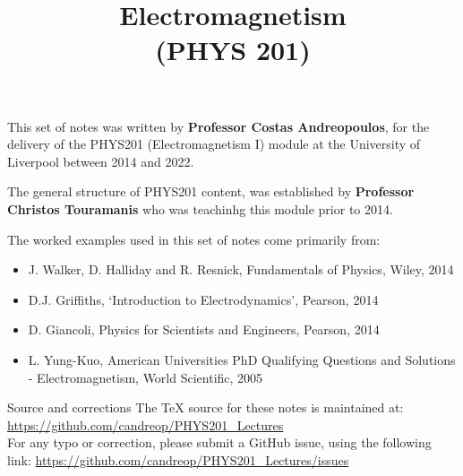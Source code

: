 \renewcommand{\prevlecture}{0}
\renewcommand{\thislecture}{0}
\renewcommand{\nextlecture}{1}

%
%

\title[PHYS 201]
{
  \Huge{Electromagnetism}\\(PHYS 201)\\
}



\begin{frame}[plain]
  \titlepage
\end{frame}


%
%

\begin{frame}{}

{\scriptsize
  This set of notes was written by
  {\bf Professor Costas Andreopoulos},
  for the delivery of the
  PHYS201 (Electromagnetism I) module
  at the University of Liverpool between 2014 and 2022.\\

  \vspace{0.2cm}

  The general structure of PHYS201 content,
  was established by {\bf Professor Christos Touramanis}
  who was teachinhg this module prior to 2014.

  \vspace{0.2cm}

  The worked examples used in this set of notes come primarily from:
  \begin{itemize}
    \item J. Walker, D. Halliday and R. Resnick, Fundamentals of Physics, Wiley, 2014
    \item D.J. Griffiths, `Introduction to Electrodynamics', Pearson, 2014
    \item D. Giancoli, Physics for Scientists and Engineers, Pearson, 2014
    \item L. Yung-Kuo, American Universities PhD Qualifying Questions and Solutions - Electromagnetism, World Scientific, 2005\\
  \end{itemize}

  \vspace{0.3cm}

  \begin{block001}{Source and corrections}
  The TeX source for these notes is maintained at:\\
  {\color{blue} \url{https://github.com/candreop/PHYS201_Lectures}}\\
  \vspace{0.2cm}
  For any typo or correction, please submit a GitHub issue, using
  the following link: {\color{blue} \url{https://github.com/candreop/PHYS201_Lectures/issues}}
  \end{block001}
}
\end{frame}


